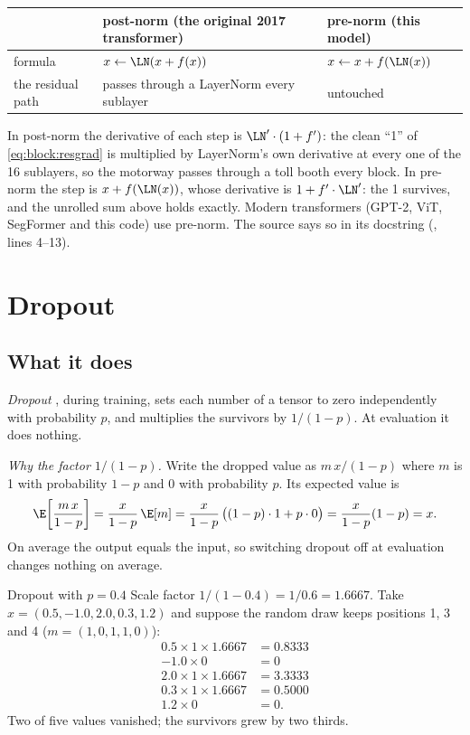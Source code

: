 \begin{center}
\begin{tabular}{lll}
\toprule
 & post-norm (the original 2017 transformer) & pre-norm (this model)\\
\midrule
formula & $x \leftarrow \LN(x + f(x))$ & $x \leftarrow x + f(\LN(x))$\\
the residual path & passes through a LayerNorm every sublayer & untouched\\
\bottomrule
\end{tabular}
\end{center}
In post-norm the derivative of each step is $\LN'\cdot(1 + f')$: the clean ``1'' of
\cref{eq:block:resgrad} is multiplied by LayerNorm's own derivative at every one of the 16
sublayers, so the motorway passes through a toll booth every block. In pre-norm the step is
$x + f(\LN(x))$, whose derivative is $1 + f'\cdot\LN'$: the 1 survives, and the unrolled sum above
holds exactly. Modern transformers (GPT-2, ViT, SegFormer and this code) use pre-norm. The source
says so in its docstring (, lines 4--13).

\section{Dropout}\label{sec:block:dropout}

\subsection{What it does}

\emph{Dropout} \citep{srivastava2014dropout}, during training, sets each number of a
tensor to zero independently with probability $p$, and multiplies the survivors by
$1/(1-p)$. At evaluation it does nothing.

\emph{Why the factor $1/(1-p)$.} Write the dropped value as $m\,x/(1-p)$ where $m$ is 1 with
probability $1-p$ and 0 with probability $p$. Its expected value is
\begin{align*}
  \E\!\left[\frac{m\,x}{1-p}\right] = \frac{x}{1-p}\,\E[m] = \frac{x}{1-p}\,\big((1-p)\cdot1 + p\cdot0\big) = \frac{x}{1-p}(1-p) = x .
\end{align*}
On average the output equals the input, so switching dropout off at evaluation changes nothing on
average.

\begin{worked}[label={we:block:dropout}]{Dropout with $p = 0.4$}
Scale factor $1/(1-0.4) = 1/0.6 = 1.6667$. Take $x = (0.5, -1.0, 2.0, 0.3, 1.2)$ and suppose the
random draw keeps positions 1, 3 and 4 ($m = (1, 0, 1, 1, 0)$):
\begin{align*}
  0.5\times1\times1.6667 &= 0.8333\\
  -1.0\times0 &= 0\\
  2.0\times1\times1.6667 &= 3.3333\\
  0.3\times1\times1.6667 &= 0.5000\\
  1.2\times0 &= 0 .
\end{align*}
Two of five values vanished; the survivors grew by two thirds.
\end{worked}


